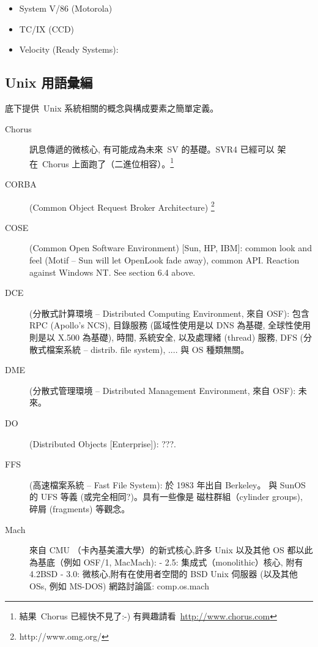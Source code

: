 \documentclass{article}
\begin{document}
\begin{CJK*}{Bg5}{ming}
\begin{itemize}
      \item System V/86 (Motorola)

      \item TC/IX (CCD)

      \item Velocity (Ready Systems):
\end{itemize}


\subsection{Unix 用語彙編}

    底下提供~Unix 系統相關的概念與構成要素之簡單定義。
\begin{description}
    \item[Chorus] 訊息傳遞的微核心, 有可能成為未來~SV 的基礎。SVR4 已經可以
         架在~Chorus 上面跑了（二進位相容）。\footnote{結果~Chorus
	已經快不見了:-) 有興趣請看~\url{http://www.chorus.com}}

    \item [CORBA] (Common Object Request Broker Architecture)
	\footnote{http://www.omg.org/}

    \item [COSE](Common Open Software Environment) [Sun, HP, IBM]: common look and
         feel (Motif -- Sun will let OpenLook fade away), common API.
         Reaction against Windows NT. See section 6.4 above.

    \item[DCE](分散式計算環境 -- Distributed Computing Environment, 來自 OSF):
         包含 RPC (Apollo's NCS), 目錄服務 (區域性使用是以 DNS 為基礎,
         全球性使用則是以 X.500 為基礎), 時間, 系統安全, 以及處理緒 (thread)
         服務, DFS (分散式檔案系統 -- distrib. file system), ....
         與 OS 種類無關。

    \item [DME] (分散式管理環境 -- Distributed Management Environment, 來自 OSF):
         未來。

    \item [DO] (Distributed Objects [Enterprise]): ???.

    \item [FFS] (高速檔案系統 -- Fast File System): 於 1983 年出自 Berkeley。
         與 SunOS 的 UFS 等義 (或完全相同?)。具有一些像是
         磁柱群組（cylinder groups), 碎屑 (fragments) 等觀念。

    \item [Mach] 來自 CMU （卡內基美濃大學）的新式核心,許多 Unix 以及其他 OS
        都以此為基底（例如 OSF/1, MacMach):
         - 2.5: 集成式（monolithic）核心, 附有 4.2BSD
         - 3.0: 微核心,附有在使用者空間的 BSD Unix 伺服器 (以及其他 OSs,
           例如 MS-DOS)
         網路討論區: comp.os.mach


\end{description}
\end{CJK*}
\end{document}

